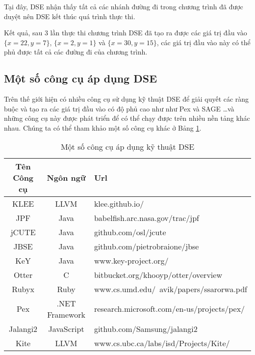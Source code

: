 Tại đây, DSE nhận thấy tất cả các nhánh đường đi trong chương trình đã được 
duyệt nên DSE kết thúc quá trình thực thi. 

Kết quả, sau $ 3 $ lần thực thi chương trình DSE đã tạo ra được các giá trị 
đầu vào $ \{x = 22, y = 7\} $, $ \{x = 2, y = 1\} $ và $ \{x = 30, y = 15\} $, 
các giá trị đầu vào này có thể phủ được tất cả các đường đi của chương trình.
	
\subsection{Một số công cụ áp dụng DSE}	

Trên thế giới hiện có nhiều công cụ sử dụng kỹ thuật DSE để giải quyết
các ràng buộc và tạo ra các giá trị đầu vào có độ phủ cao như như Pex
\cite{tillmann2008pex} và SAGE \cite{godefroid2008automated}\dots và
những công cụ này được phát triển để có thể chạy được trên nhiều nền
tảng khác nhau. Chúng ta có thể tham khảo một số công cụ khác ở Bảng \ref{tbl:DSETools}.
		
\begin{table}[H]
  \centering
  \label{tbl:DSETools}
  \caption{Một số công cụ áp dụng kỹ thuật DSE}
  \begin{tabular} {|c|c|l|}
    \hline 
    \textbf{Tên Công cụ} & \textbf{Ngôn ngữ} & \textbf{Url} \\ 
    \hline 
    KLEE & LLVM & klee.github.io/ \\ 
    \hline 
    JPF	 & Java	& babelfish.arc.nasa.gov/trac/jpf \\
    \hline 
    jCUTE &	Java &	github.com/osl/jcute \\
    \hline 
    JBSE	& Java	 & github.com/pietrobraione/jbse \\
    \hline 
    KeY &	Java &	www.key-project.org/ \\	    
    \hline 
    Otter &	C	& bitbucket.org/khooyp/otter/overview \\
    \hline 
    Rubyx & 	Ruby &	www.cs.umd.edu/~avik/papers/ssarorwa.pdf \\
    \hline 
    Pex	& .NET Framework	 & research.microsoft.com/en-us/projects/pex/ \\
    \hline 
    Jalangi2 &	JavaScript &	github.com/Samsung/jalangi2 \\
    \hline 
    Kite &	LLVM &	www.cs.ubc.ca/labs/isd/Projects/Kite/ \\
    \hline 
  \end{tabular} 
\end{table}
	
